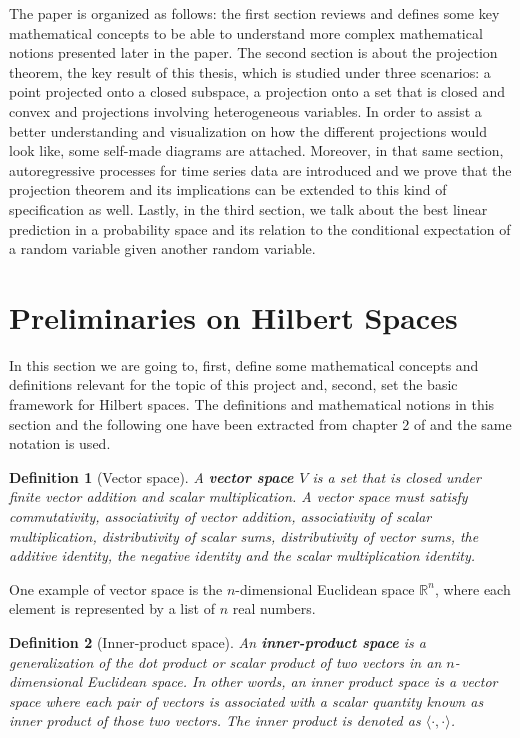 \documentclass{article}
\newtheorem{defn}{Definition}
\begin{document}
The paper is organized as follows: the first section reviews and defines some key mathematical concepts to be able to understand more complex mathematical notions presented later in the paper. The second section is about the projection theorem, the key result of this thesis, which is studied under three scenarios: a point projected onto a closed subspace, a projection onto a set that is closed and convex and projections involving heterogeneous variables. In order to assist a better understanding and visualization on how the different projections would look like, some self-made diagrams are attached. Moreover, in that same section, autoregressive processes for time series data are introduced and we prove that the projection theorem and its implications can be extended to this kind of specification as well. Lastly, in the third section, we talk about the best linear prediction in a probability space and its relation to the conditional expectation of a random variable given another random variable.

\newpage

\section{Preliminaries on Hilbert Spaces}
In this section we are going to, first, define some mathematical concepts and definitions relevant for the topic of this project and, second, set the basic framework for Hilbert spaces. The definitions and mathematical notions in this section and the following one have been extracted from chapter 2 of \citet{BrockwellDavis:1991} and the same notation is used. \newline

\begin{defn}[Vector space]
A \textbf{vector space $V$} is a set that is closed under finite vector addition and scalar multiplication. A vector space must satisfy commutativity, associativity of vector addition, associativity of scalar multiplication, distributivity of scalar sums, distributivity of vector sums, the additive identity, the negative identity and the scalar multiplication identity.
\end{defn}

One example of vector space is the $n$-dimensional Euclidean space $\mathbb{R}^n$, where each element is represented by a list of $n$ real numbers. \newline

\begin{defn}[Inner-product space]
An \textbf{inner-product space} is a generalization of the dot product or scalar product of two vectors in an $n$-dimensional Euclidean space. In other words, an inner product space is a vector space where each pair of vectors is associated with a scalar quantity known as inner product of those two vectors. The inner product is denoted as $\langle \cdot , \cdot \rangle$.  \newline
\end{defn}
\end{document}
